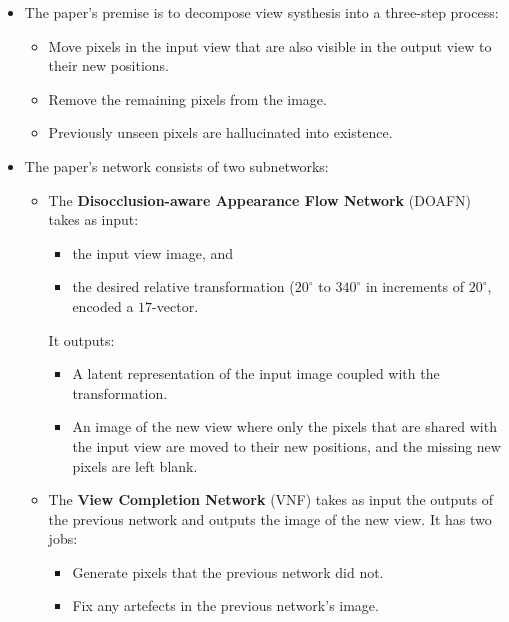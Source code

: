 \documentclass[10pt]{article}
\begin{document}
  \begin{itemize}
  	\item The paper's premise is to decompose view systhesis into a three-step process:
  	\begin{itemize}
  		\item Move pixels in the input view that are also visible in the output view to their new positions.

  		\item Remove the remaining pixels from the image.

  		\item Previously unseen pixels are hallucinated into existence.
  	\end{itemize}

  	\item The paper's network consists of two subnetworks:
  	\begin{itemize}
  		\item The \textbf{Disocclusion-aware Appearance Flow Network} (DOAFN) takes as input:
  		\begin{itemize}
  			\item the input view image, and
  			\item the desired relative transformation ($20^\circ$ to $340^\circ$ in increments of $20^\circ$, encoded a $17$-vector.
		\end{itemize}
		It outputs:
		\begin{itemize}
			\item A latent representation of the input image coupled with the transformation.

			\item An image of the new view where only the pixels that are shared with the input view are moved to their new positions, and the missing new pixels are left blank.
		\end{itemize}

		\item The \textbf{View Completion Network} (VNF) takes as input the outputs of the previous network and outputs the image of the new view. It has two jobs:
		\begin{itemize}
			\item Generate pixels that the previous network did not.
			\item Fix any artefects in the previous network's image.
		\end{itemize}
  	\end{itemize}
  \end{itemize}
\end{document}
